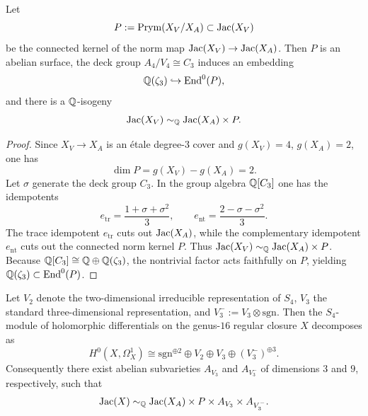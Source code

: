 \begin{corollary}\label{cor:resolvent-prym}
Let
\[
P:=\operatorname{Prym}(X_V/X_A)\subset \operatorname{Jac}(X_V)
\]
be the connected kernel of the norm map \(\operatorname{Jac}(X_V)\to\operatorname{Jac}(X_A)\).
Then \(P\) is an abelian surface, the deck group \(A_4/V_4\cong C_3\) induces an embedding
\[
\mathbb{Q}(\zeta_3)\hookrightarrow \mathrm{End}^0(P),
\]
and there is a \(\mathbb{Q}\)-isogeny
\[
\operatorname{Jac}(X_V)\sim_{\mathbb{Q}}\operatorname{Jac}(X_A)\times P.
\]
\end{corollary}

\begin{proof}
Since \(X_V\to X_A\) is an étale degree-\(3\) cover and \(g(X_V)=4\), \(g(X_A)=2\), one has
\[
\dim P=g(X_V)-g(X_A)=2.
\]
Let \(\sigma\) generate the deck group \(C_3\).
In the group algebra \(\mathbb{Q}[C_3]\) one has the idempotents
\[
e_{\mathrm{tr}}=\frac{1+\sigma+\sigma^2}{3},\qquad
e_{\mathrm{nt}}=\frac{2-\sigma-\sigma^2}{3}.
\]
The trace idempotent \(e_{\mathrm{tr}}\) cuts out \(\operatorname{Jac}(X_A)\), while the complementary idempotent \(e_{\mathrm{nt}}\) cuts out the connected norm kernel \(P\).
Thus \(\operatorname{Jac}(X_V)\sim_{\mathbb{Q}}\operatorname{Jac}(X_A)\times P\).
Because \(\mathbb{Q}[C_3]\cong\mathbb{Q}\oplus\mathbb{Q}(\zeta_3)\), the nontrivial factor acts faithfully on \(P\), yielding \(\mathbb{Q}(\zeta_3)\subset\mathrm{End}^0(P)\).
\end{proof}

\begin{theorem}\label{thm:regular-closure-hodge}
Let \(V_2\) denote the two-dimensional irreducible representation of \(S_4\), \(V_3\) the standard three-dimensional representation, and \(V_3^-:=V_3\otimes\mathrm{sgn}\).
Then the \(S_4\)-module of holomorphic differentials on the genus-\(16\) regular closure \(X\) decomposes as
\[
H^0(X,\Omega_X^1)\cong \mathrm{sgn}^{\oplus 2}\oplus V_2\oplus V_3\oplus (V_3^-)^{\oplus 3}.
\]
Consequently there exist abelian subvarieties \(A_{V_3}\) and \(A_{V_3^-}\) of dimensions \(3\) and \(9\), respectively, such that
\[
\operatorname{Jac}(X)\sim_{\mathbb{Q}}\operatorname{Jac}(X_A)\times P\times A_{V_3}\times A_{V_3^-}.
\]
\end{theorem}

